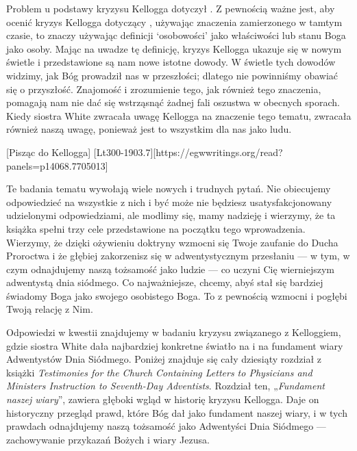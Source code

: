 Problem u podstawy kryzysu Kellogga dotyczył . Z pewnością ważne jest, aby ocenić kryzys Kellogga dotyczący , używając znaczenia zamierzonego w tamtym czasie, to znaczy używając definicji ‘osobowości’ jako właściwości lub stanu Boga jako osoby. Mając na uwadze tę definicję, kryzys Kellogga ukazuje się w nowym świetle i przedstawione są nam nowe istotne dowody. W świetle tych dowodów widzimy, jak Bóg prowadził nas w przeszłości; dlatego nie powinniśmy obawiać się o przyszłość. Znajomość i zrozumienie tego, jak również tego znaczenia, pomagają nam nie dać się wstrząsnąć żadnej fali oszustwa w obecnych sporach. Kiedy siostra White zwracała uwagę Kellogga na znaczenie tego tematu, zwracała również naszą uwagę, ponieważ jest to wszystkim dla nas jako ludu.

[Pisząc do Kellogga] [Lt300-1903.7][https://egwwritings.org/read?panels=p14068.7705013]

Te badania tematu  wywołają wiele nowych i trudnych pytań. Nie obiecujemy odpowiedzieć na wszystkie z nich i być może nie będziesz usatysfakcjonowany udzielonymi odpowiedziami, ale modlimy się, mamy nadzieję i wierzymy, że ta książka spełni trzy cele przedstawione na początku tego wprowadzenia. Wierzymy, że dzięki ożywieniu doktryny  wzmocni się Twoje zaufanie do Ducha Proroctwa i że głębiej zakorzenisz się w adwentystycznym przesłaniu — w tym, w czym odnajdujemy naszą tożsamość jako ludzie — co uczyni Cię wierniejszym adwentystą dnia siódmego. Co najważniejsze, chcemy, abyś stał się bardziej świadomy Boga jako swojego osobistego Boga. To z pewnością wzmocni i pogłębi Twoją relację z Nim.

Odpowiedzi w kwestii  znajdujemy w badaniu kryzysu związanego z Kelloggiem, gdzie siostra White dała najbardziej konkretne światło na  i na fundament wiary Adwentystów Dnia Siódmego. Poniżej znajduje się cały dziesiąty rozdział z książki \textit{Testimonies for the Church Containing Letters to Physicians and Ministers Instruction to Seventh-Day Adventists}. Rozdział ten, „\textit{Fundament naszej wiary}”, zawiera głęboki wgląd w historię kryzysu Kellogga. Daje on historyczny przegląd prawd, które Bóg dał jako fundament naszej wiary, i w tych prawdach odnajdujemy naszą tożsamość jako Adwentyści Dnia Siódmego — zachowywanie przykazań Bożych i wiary Jezusa.